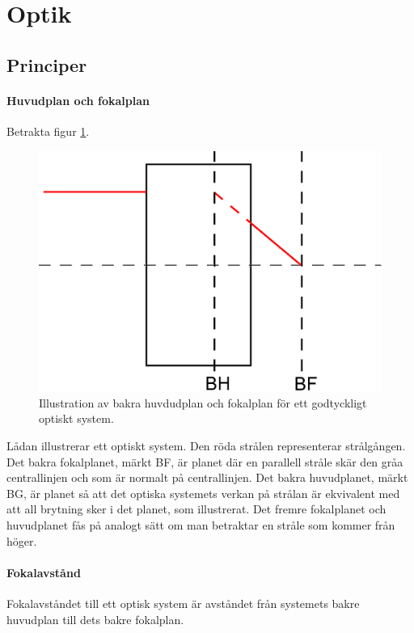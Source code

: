\section{Optik}

\subsection{Principer}

\paragraph{Huvudplan och fokalplan}
Betrakta figur \ref{fig:optical_planes}.
\begin{figure}[!ht]
	\centering
	\includegraphics[scale=0.8]{./Images/optical_planes/optical_planes.eps}
	\caption{Illustration av bakra huvdudplan och fokalplan för ett godtyckligt optiskt system.}
	\label{fig:optical_planes}
\end{figure}

Lådan illustrerar ett optiskt system. Den röda strålen representerar strålgången. Det bakra fokalplanet, märkt BF, är planet där en parallell stråle skär den gråa centrallinjen och som är normalt på centrallinjen. Det bakra huvudplanet, märkt BG, är planet så att det optiska systemets verkan på strålan är ekvivalent med att all brytning sker i det planet, som illustrerat. Det fremre fokalplanet och huvudplanet fås på analogt sätt om man betraktar en stråle som kommer från höger.

\paragraph{Fokalavstånd}
Fokalavståndet till ett optisk system är avståndet från systemets bakre huvudplan till dets bakre fokalplan.

